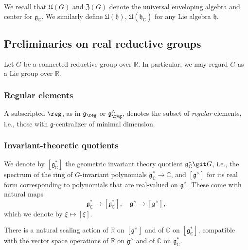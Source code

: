 We recall that $\mathfrak{U}(G)$ and $\mathfrak{Z}(G)$ denote the universal enveloping algebra and center for $\mathfrak{g}_{\mathbb{C}}$.  We similarly define  $\mathfrak{U}(\mathfrak{h})$, $\mathfrak{U}(\mathfrak{h}_{\mathbb{C}})$ for any Lie algebra $\mathfrak{h}$.

\subsection{Preliminaries on real reductive groups}\label{sec:prel-real-reduct}
Let $G$ be a connected reductive group over $\mathbb{R}$.  In particular, we may regard $G$ as a Lie group over $\mathbb{R}$.

\subsubsection{Regular elements}\label{sec:regular-elements}
A subscripted $\reg$, as in $\mathfrak{g}_{\reg}$ or $\mathfrak{g}^\wedge_{\reg}$, denotes the subset of \emph{regular} elements, i.e., those with $\mathfrak{g}$-centralizer of minimal dimension.

\subsubsection{Invariant-theoretic quotients}
We denote by $[\mathfrak{g}_\mathbb{C}^*]$ the geometric invariant theory  quotient $\mathfrak{g}_\mathbb{C}^* \git G$, i.e., the spectrum of the ring of $G$-invariant polynomials $\mathfrak{g}_\mathbb{C}^* \rightarrow \mathbb{C}$, and $[\mathfrak{g}^\wedge]$ for its real form corresponding to polynomials that are real-valued on $\mathfrak{g}^\wedge$.  These come with natural maps
\[
  \mathfrak{g}_\mathbb{C}^* \rightarrow [\mathfrak{g}_\mathbb{C}^*], \quad \mathfrak{g}^\wedge \rightarrow [\mathfrak{g}^\wedge],
\]
which we denote by $\xi \mapsto [\xi]$.

There is a natural scaling action of $\mathbb{R}$ on $[\mathfrak{g}^\wedge]$ and of $\mathbb{C}$ on $[\mathfrak{g}_{\mathbb{C}}^*]$, compatible with the vector space operations of $\mathbb{R}$ on $\mathfrak{g}^\wedge$ and
of
$\mathbb{C}$
on
$\mathfrak{g}_{\mathbb{C}}^*$.

